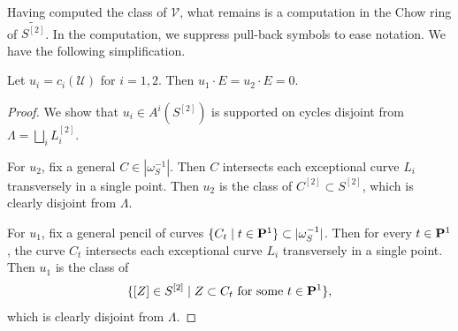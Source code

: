 \documentclass[12pt,reqno]{amsart}
\numberwithin{equation}{section}
\begin{document}
Having computed the class of $\mathcal V$, what remains is a computation in the Chow ring of $\widetilde{S^{[2]}}$.
In the computation, we suppress pull-back symbols to ease notation.
We have the following simplification.
\begin{proposition}
    \label{lemma:uE}
  Let $u_i = c_i(\mathcal U)$ for $i = 1, 2$.
  Then  $u_{1}\cdot E = u_{2} \cdot E = 0$.
\end{proposition}
\begin{proof}
  We show that $u_i \in A^i(S^{[2]})$ is supported on cycles disjoint from $\Lambda = \bigsqcup_i L^{[2]}_i$.

  For $u_2$, fix a general $C \in |\omega_S^{-1}|$.
  Then $C$ intersects each exceptional curve $L_i$ transversely in a single point.
  Then $u_2$ is the class of $C^{[2]} \subset S^{[2]}$, which is clearly disjoint from $\Lambda$.
  
  For $u_1$, fix a general pencil of curves $\{C_t \mid t \in \P^1\} \subset |\omega_S^{-1}|$.
  Then for every $t \in \P^1$, the curve $C_t$ intersects each exceptional curve $L_i$ transversely in a single point.
  Then $u_{1}$ is the class of
  \[\{[Z] \in S^{[2]} \mid Z \subset C_{t} \text{ for some $t\in \P^{1}$}\},\]
  which is clearly disjoint from $\Lambda$.
\end{proof}
\end{document}
